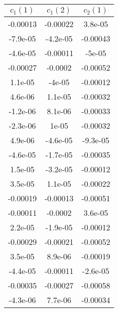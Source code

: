 \begin{tiny}\begin{tabular}{|c|c|c|}
\hline
\textbf{$c_1(1)$}&\textbf{$c_1(2)$}&\textbf{$c_2(1)$}\\\hline
-0.00013&-0.00022&3.8e-05\\\hline
-7.9e-05&-4.2e-05&-0.00043\\\hline
-4.6e-05&-0.00011&-5e-05\\\hline
-0.00027&-0.0002&-0.00052\\\hline
1.1e-05&-4e-05&-0.00012\\\hline
4.6e-06&1.1e-05&-0.00032\\\hline
-1.2e-06&8.1e-06&-0.00033\\\hline
-2.3e-06&1e-05&-0.00032\\\hline
4.9e-06&-4.6e-05&-9.3e-05\\\hline
-4.6e-05&-1.7e-05&-0.00035\\\hline
1.5e-05&-3.2e-05&-0.00012\\\hline
3.5e-05&1.1e-05&-0.00022\\\hline
-0.00019&-0.00013&-0.00051\\\hline
-0.00011&-0.0002&3.6e-05\\\hline
2.2e-05&-1.9e-05&-0.00012\\\hline
-0.00029&-0.00021&-0.00052\\\hline
3.5e-05&8.9e-06&-0.00019\\\hline
-4.4e-05&-0.00011&-2.6e-05\\\hline
-0.00035&-0.00027&-0.00058\\\hline
-4.3e-06&7.7e-06&-0.00034\\\hline
\end{tabular}
\end{tiny}